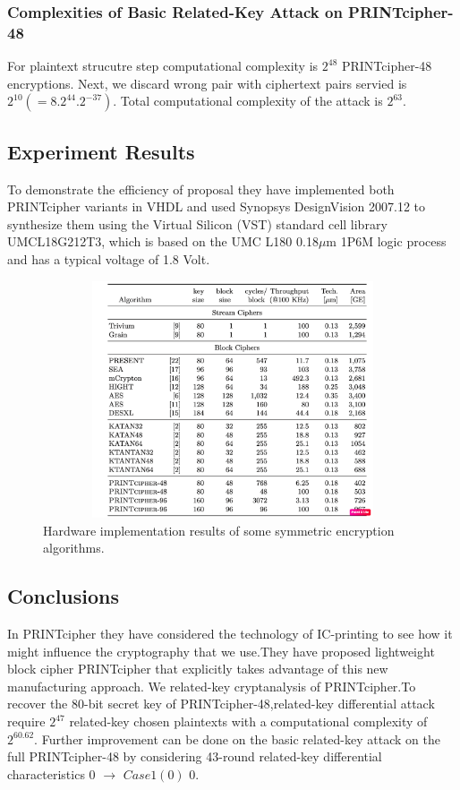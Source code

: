 \documentclass[journal=tosc,preprint]{iacrtrans}
\begin{document}
\subsubsection{Complexities of Basic Related-Key Attack on PRINTcipher-48}
For plaintext strucutre step computational complexity is  \(2^48\) PRINTcipher-48 encryptions. Next, we discard wrong pair with ciphertext pairs servied is \(2^10(=8.2^{44}.2^{-37})\). Total computational complexity of the attack is \(2^{63}\).

\subsection{Experiment Results}
To demonstrate the efficiency of proposal they have implemented both PRINTcipher variants in VHDL and used Synopsys DesignVision 2007.12 to synthesize them using the Virtual Silicon (VST) standard cell library UMCL18G212T3, which is based on the UMC L180 0.18$\mu$m 1P6M logic process and has a typical voltage of 1.8 Volt.
\begin{figure}[ht]
	\centering
	\includegraphics[height=7cm, width=12cm]{pics/hardware.png}
	\caption{Hardware implementation results of some symmetric encryption algorithms.}
\end{figure}

\subsection{Conclusions}
In PRINTcipher they have considered the technology of IC-printing to see how it might influence the  cryptography that we use.They have proposed lightweight block cipher PRINTcipher that explicitly takes advantage of this new manufacturing approach. We related-key cryptanalysis of PRINTcipher.To recover the 80-bit secret key of PRINTcipher-48,related-key differential attack require \(2^47\) related-key chosen plaintexts with a computational complexity of \(2^{60.62}\). Further improvement can be done on the basic related-key attack on the full PRINTcipher-48 by considering 43-round related-key differential characteristics 0 $\rightarrow$ \(Case 1 (0)\) 0.
\end{document}

